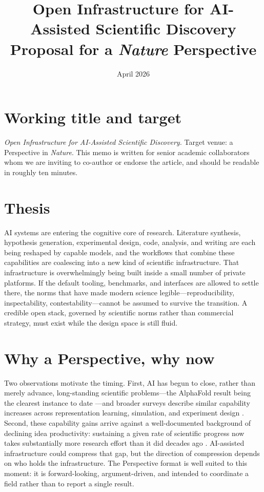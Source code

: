 \documentclass[11pt]{article}
\title{\textbf{Open Infrastructure for AI-Assisted Scientific Discovery}\\[0.4em]
\large Proposal for a \emph{Nature} Perspective}
\author{}
\date{April 2026}
\begin{document}
\maketitle

\section{Working title and target}
\emph{Open Infrastructure for AI-Assisted Scientific Discovery.} Target venue: a Perspective in \emph{Nature}. This memo is written for senior academic collaborators whom we are inviting to co-author or endorse the article, and should be readable in roughly ten minutes.

\section{Thesis}
AI systems are entering the cognitive core of research. Literature synthesis, hypothesis generation, experimental design, code, analysis, and writing are each being reshaped by capable models, and the workflows that combine these capabilities are coalescing into a new kind of scientific infrastructure. That infrastructure is overwhelmingly being built inside a small number of private platforms. If the default tooling, benchmarks, and interfaces are allowed to settle there, the norms that have made modern science legible---reproducibility, inspectability, contestability---cannot be assumed to survive the transition. A credible open stack, governed by scientific norms rather than commercial strategy, must exist while the design space is still fluid.

\section{Why a Perspective, why now}
Two observations motivate the timing. First, AI has begun to close, rather than merely advance, long-standing scientific problems---the AlphaFold result being the clearest instance to date \citep{jumper2021alphafold}---and broader surveys describe similar capability increases across representation learning, simulation, and experiment design \citep{wang2023discovery}. Second, these capability gains arrive against a well-documented background of declining idea productivity: sustaining a given rate of scientific progress now takes substantially more research effort than it did decades ago \citep{bloom2020ideas}. AI-assisted infrastructure could compress that gap, but the direction of compression depends on who holds the infrastructure. The Perspective format is well suited to this moment: it is forward-looking, argument-driven, and intended to coordinate a field rather than to report a single result.
\end{document}
